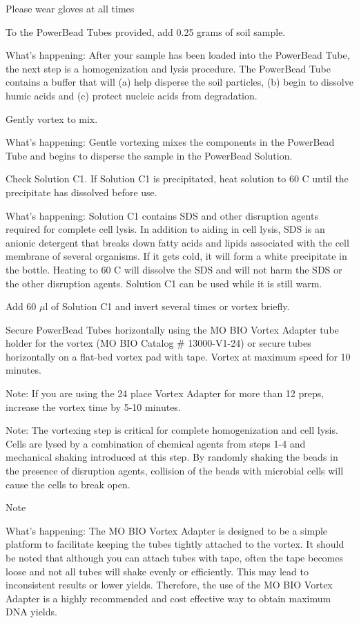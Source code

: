 \documentclass[12pt]{../SOP3_alpha}
\begin{document}
Please wear gloves at all times

\NP To the PowerBead Tubes provided, add 0.25 grams of soil sample.

What's happening: After your sample has been loaded into the PowerBead Tube, the next step is a homogenization and lysis procedure. The PowerBead
Tube contains a buffer that will (a) help disperse the soil particles, (b) begin to dissolve humic acids and (c) protect nucleic acids from degradation.

\NP Gently vortex to mix.

What's happening: Gentle vortexing mixes the components in the PowerBead Tube and begins to disperse the sample in the PowerBead Solution.

\NP Check Solution C1. If Solution C1 is precipitated, heat solution to 60 \degree C until the precipitate has dissolved before use.

What's happening: Solution C1 contains SDS and other disruption agents required for complete cell lysis. In addition to aiding in cell lysis, SDS is an anionic detergent that breaks down fatty acids and lipids associated with the cell membrane of several organisms. If it gets cold, it will form a white precipitate in the bottle. Heating to 60 \degree C will dissolve the SDS and will not harm the SDS or the other disruption agents. Solution C1 can be used while it is still warm.

\NP Add 60 $\mu$l of Solution C1 and invert several times or vortex briefly.

\NP Secure PowerBead Tubes horizontally using the MO BIO Vortex Adapter tube holder for the vortex (MO BIO Catalog \# 13000-V1-24) or secure tubes
horizontally on a flat-bed vortex pad with tape. Vortex at maximum speed for 10 minutes.

Note: If you are using the 24 place Vortex Adapter for more than 12 preps, increase the vortex time by 5-10 minutes. 

Note: The vortexing step is critical for complete homogenization and cell lysis. Cells are lysed by a combination of chemical agents from steps 1-4 and mechanical shaking introduced at this step. By randomly shaking the beads in the presence
of disruption agents, collision of the beads with microbial cells will cause the cells to break open.

Note

What's happening: The MO BIO Vortex Adapter is designed to be a simple platform to facilitate keeping the tubes tightly attached to the vortex. It should be noted that although you can attach tubes with tape, often the tape becomes loose and not all tubes will shake evenly or efficiently. This may lead to inconsistent results or lower yields. Therefore, the use of the MO BIO
Vortex Adapter is a highly recommended and cost effective way to obtain maximum DNA yields.
\end{document}
